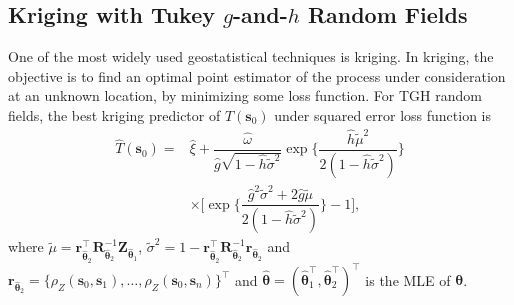 \documentclass[conference]{IEEEtran}
\begin{document}
\subsection{Kriging with Tukey $g$-and-$h$ Random Fields}
One of the most widely used geostatistical techniques is 
kriging. In kriging, the objective is to find an optimal point 
estimator of the process under consideration at an unknown 
location, by minimizing some loss function. For TGH random 
fields, the best kriging predictor of $T(\bm s_0)$ under squared error 
loss function is
\begin{equation}
\begin{split}
\widehat{T}(\bm{s}_0) = & \widehat{\xi} + \dfrac{\widehat{\omega}}{\widehat{g} \sqrt{1 - \widehat{h} \tilde{\sigma}^2}} \exp \bigg \{ \dfrac{\widehat{h} \tilde{\mu}^2}{2(1 - \widehat{h} \tilde{\sigma}^2)} \bigg \}\\ & \times \bigg [ \exp \bigg \{ \dfrac{\widehat{g}^2 \tilde{\sigma}^2 + 2 \widehat{g} \tilde{\mu}}{2(1 - \widehat{h} \tilde{\sigma}^2)} \bigg \} -1 \bigg ],
\end{split}
\label{eq:prediction}
\end{equation}
where $\tilde{\mu} = \bm{r}_{\widehat{\bm{\theta}}_2}^\top \bm{R}_{\widehat{\bm{\theta}}_2}^{-1} \bm{Z}_{\widehat{\bm{\theta}}_1}$, $\tilde{\sigma}^2 = 1 - \bm{r}_{\widehat{\bm{\theta}}_2}^\top \bm{R}_{\widehat{\bm{\theta}}_2}^{-1} \bm{r}_{\widehat{\bm{\theta}}_2}$ and $\bm{r}_{\widehat{\bm{\theta}}_2} = \{\rho_Z(\bm{s}_0,\bm{s}_1),\ldots,\rho_Z(\bm{s}_0,\bm{s}_n)\}^\top$ and $\widehat{\bm \theta} = (\widehat{\bm \theta}_1 ^\top , \widehat{\bm \theta}_2 ^\top)^\top$ is the MLE of $\bm \theta$.
%
\end{document}

